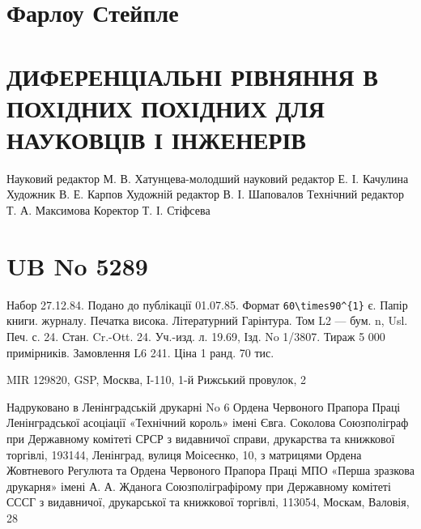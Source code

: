 \documentclass[
  ukrainian,
]{article}
\begin{document}
\section{Фарлоу
Стейпле}\label{ux444ux430ux440ux43bux43eux443-ux441ux442ux435ux439ux43fux43bux435}

\section{ДИФЕРЕНЦІАЛЬНІ РІВНЯННЯ В ПОХІДНИХ ПОХІДНИХ ДЛЯ НАУКОВЦІВ І
ІНЖЕНЕРІВ}\label{ux434ux438ux444ux435ux440ux435ux43dux446ux456ux430ux43bux44cux43dux456-ux440ux456ux432ux43dux44fux43dux43dux44f-ux432-ux43fux43eux445ux456ux434ux43dux438ux445-ux43fux43eux445ux456ux434ux43dux438ux445-ux434ux43bux44f-ux43dux430ux443ux43aux43eux432ux446ux456ux432-ux456-ux456ux43dux436ux435ux43dux435ux440ux456ux432}

Науковий редактор М. В. Хатунцева-молодший науковий редактор Е. І.
Качулина Художник В. Е. Карпов Художній редактор В. І. Шаповалов
Технічний редактор Т. А. Максимова Коректор Т. І. Стіфсева

\section{UB No 5289}\label{ub-no-5289}

Набор 27.12.84. Подано до публікації 01.07.85. Формат
\texttt{60\textbackslash{}times90\^{}\{1\}} є. Папір книги. журналу.
Печатка висока. Літературний Гарінтура. Том L2 --- бум. n, Usl. Печ. с.
24. Стан. Cr.-Ott. 24. Уч.-изд. л. 19.69, Ізд. No 1/3807. Тираж 5 000
примірників. Замовлення L6 241. Ціна 1 ранд. 70 тис.

MIR 129820, GSP, Москва, I-110, 1-й Рижський провулок, 2

Надруковано в Ленінградській друкарні No 6 Ордена Червоного Прапора
Праці Ленінградської асоціації «Технічний король» імені Євга. Соколова
Союзполіграф при Державному комітеті СРСР з видавничої справи,
друкарства та книжкової торгівлі, 193144, Ленінград, вулиця Моісеєнко,
10, з матрицями Ордена Жовтневого Регулюта та Ордена Червоного Прапора
Праці МПО «Перша зразкова друкарня» імені А. А. Жданога
Союзполіграфірому при Державному комітеті СССГ з видавничої, друкарської
та книжкової торгівлі, 113054, Москам, Валовія, 28
\end{document}
